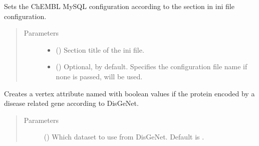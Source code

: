 \documentclass[letterpaper,10pt,english]{sphinxmanual}
\begin{document}
\begin{fulllineitems}
\begin{fulllineitems}
\label{\detokenize{main:pypath.main.PyPath.set_chembl_mysql}}
Sets the ChEMBL MySQL configuration according to the 
section in  ini file configuration.
\begin{quote}\begin{description}
\item[{Parameters}] \leavevmode\begin{itemize}
\item {} 
 () \textendash{} Section title of the ini file.

\item {} 
 () \textendash{} Optional,  by default. Specifies the configuration
file name if none is passed, 
will be used.

\end{itemize}

\end{description}\end{quote}

\end{fulllineitems}


\begin{fulllineitems}
\label{\detokenize{main:pypath.main.PyPath.set_disease_genes}}
Creates a vertex attribute named  with boolean values 
if the protein encoded by a disease related gene according to
DisGeNet.
\begin{quote}\begin{description}
\item[{Parameters}] \leavevmode
{} () \textendash{} Which dataset to use from DisGeNet. Default is .

\end{description}\end{quote}


\end{fulllineitems}
\end{fulllineitems}
\end{document}
